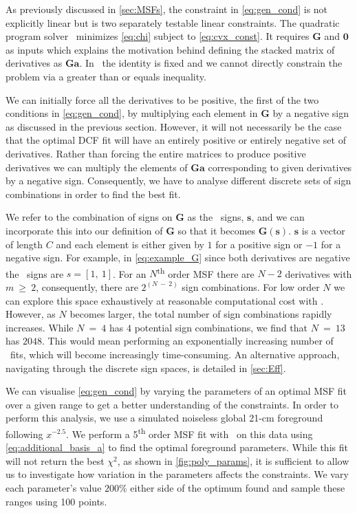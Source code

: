 As previously discussed in \cref{sec:MSFs}, the constraint in \cref{eq:gen_cond} is not explicitly linear but is two separately testable linear constraints. The quadratic program solver \cvxopt~minimizes \cref{eq:chi} subject to \cref{eq:cvx_const}. It requires $\mathbf{G}$ and $\mathbf{0}$ as inputs which explains the motivation behind defining the stacked matrix of derivatives as $\mathbf{Ga}$. In \cvxopt~the identity is fixed and we cannot directly constrain the problem via a greater than or equals inequality.

We can initially force all the derivatives to be positive, the first of the two conditions in \cref{eq:gen_cond}, by multiplying each element in $\mathbf{G}$ by a negative sign as discussed in the previous section. However, it will not necessarily be the case that the optimal DCF fit will have an entirely positive or entirely negative set of derivatives. Rather than forcing the entire matrices to produce positive derivatives we can multiply the elements of $\mathbf{Ga}$ corresponding to given derivatives by a negative sign. Consequently, we have to analyse different discrete sets of sign combinations in order to find the best fit. 

We refer to the combination of signs on $\mathbf{G}$ as the \maxsmooth~signs, $\mathbf{s}$, and we can incorporate this into our definition of $\mathbf{G}$ so that it becomes $\mathbf{G}(\mathbf{s})$. $\mathbf{s}$ is a vector of length $C$ and each element is either given by $1$ for a positive sign or $-1$ for a negative sign. For example, in \cref{eq:example_G} since both derivatives are negative the \maxsmooth~signs are $s = [1,~1]$. For an $N$\textsuperscript{th} order MSF there are $N-2$ derivatives with $m~\ge~2$, consequently, there are $2^{(N~-~2)}$ sign combinations. For low order $N$ we can explore this space exhaustively at reasonable computational cost with \cvxopt. However, as $N$ becomes larger, the total number of sign combinations rapidly increases. While $N~=~4$ has $4$ potential sign combinations, we find that $N~=~13$ has $2048$. This would mean performing an exponentially increasing number of \cvxopt~fits, which will become increasingly time-consuming. An alternative approach, navigating through the discrete sign spaces, is detailed in \cref{sec:Eff}.

We can visualise \cref{eq:gen_cond} by varying the parameters of an optimal MSF fit over a given range to get a better understanding of the constraints. In order to perform this analysis, we use a simulated noiseless global 21-cm foreground following $x^{-2.5}$. We perform a 5\textsuperscript{th} order MSF fit with \maxsmooth~on this data using \cref{eq:additional_basis_a} to find the optimal foreground parameters. While this fit will not return the best $\chi^2$, as shown in \cref{fig:poly_params}, it is sufficient to allow us to investigate how variation in the parameters affects the constraints. We vary each parameter's value $200\%$ either side of the optimum found and sample these ranges using 100 points.

